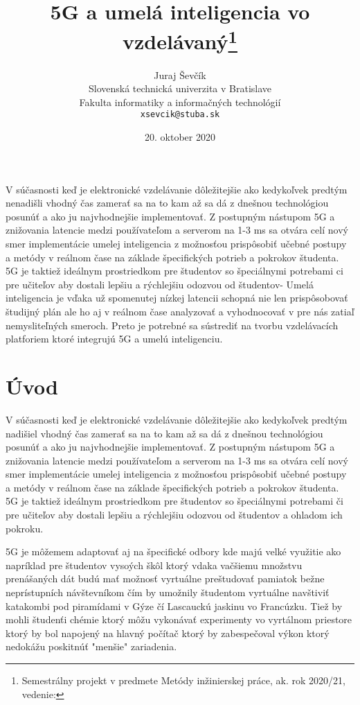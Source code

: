 \documentclass[10pt,oneside,sloak,a4paper]{article}
\title{5G a umelá inteligencia vo vzdelávaný\thanks{Semestrálny projekt v predmete Metódy inžinierskej práce, ak. rok 2020/21, vedenie:}}
\author{Juraj Ševčík\\[2pt]
	{\small Slovenská technická univerzita v Bratislave}\\
	{\small Fakulta informatiky a informačných technológií}\\
	{\small \texttt{xsevcik@stuba.sk}}
}
\date{\small 20. oktober 2020}
\begin{document}
\maketitle

\begin{abstract}


\end{abstract}
V súčasnosti  keď je elektronické vzdelávanie dôležitejšie ako kedykoľvek predtým nenadišli vhodný čas zamerať sa na to kam až sa dá z dnešnou technológiou posunúť a ako ju najvhodnejšie implementovať. Z postupným nástupom 5G a znižovania latencie medzi používateľom a serverom na 1-3 ms sa otvára celí nový smer implementácie umelej inteligencia z možnosťou prispôsobiť učebné postupy a metódy v reálnom čase na základe špecifických potrieb a pokrokov študenta.  5G je taktiež ideálnym prostriedkom pre študentov so špeciálnymi potrebami ci pre učiteľov aby dostali lepšiu a rýchlejšiu odozvou od študentov-
Umelá inteligencia je vďaka už spomenutej nízkej latencii schopná nie len prispôsobovať študijný plán ale ho aj v reálnom čase analyzovať  a vyhodnocovať v pre nás zatiaľ nemysliteľných smeroch. Preto je potrebné sa sústrediť na tvorbu vzdelávacích platforiem ktoré integrujú 5G a umelú inteligenciu.

\newpage
\section{Úvod}
V súčasnosti  keď je elektronické vzdelávanie dôležitejšie ako kedykoľvek predtým nadišiel vhodný čas zamerať sa na to kam až sa dá z dnešnou technológiou posunúť a ako ju najvhodnejšie implementovať. Z postupným nástupom 5G a znižovania latencie medzi používateľom a serverom na 1-3 ms sa otvára celí nový smer implementácie umelej inteligencia z možnosťou prispôsobiť učebné postupy a metódy v reálnom čase na základe špecifických potrieb a pokrokov študenta. 5G je taktiež ideálnym prostriedkom pre študentov so špeciálnymi potrebami či pre učiteľov aby dostali lepšiu a rýchlejšiu odozvou od študentov a ohladom ich pokroku. 

5G je môžemem adaptovať aj na špecifické odbory kde majú velké využitie ako napríklad pre študentov vysoých škôl ktorý vdaka vačšiemu množstvu prenášaných dát budú mať možnosť vyrtuálne preštudovať pamiatok bežne neprístupních návštevníkom čím by umožnily študentom vyrtuálne navštiviť katakombi pod piramídami v Gýze čí Lascauckú jaskinu vo Francúzku. Tiež by mohli študenťi chémie ktorý môžu vykonávať experimenty vo vyrtálnom priestore ktorý by bol napojený na hlavný počítač ktorý by zabespečoval výkon ktorý nedokážu poskitnúť "menšie" zariadenia.
\end{document}
